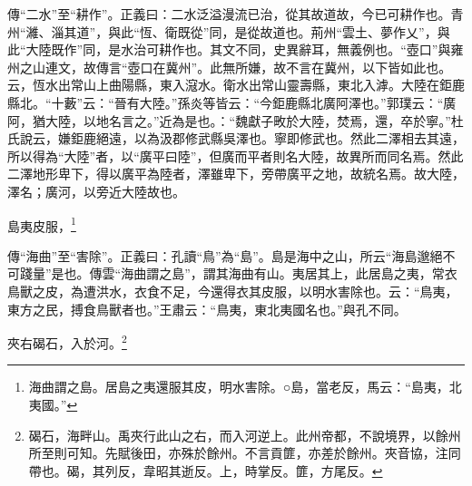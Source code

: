 {\noindent\zhuan{}\fzbyks 傳“二水”至“耕作”。正義曰：二水泛溢漫流已治，從其故道故，今已可耕作也。青州“濰、淄其道”，與此“恆、衛既從”同，是從故道也。荊州“雲土、夢作乂”，與此“大陸既作”同，是水治可耕作也。其文不同，史異辭耳，無義例也。“壺口”與雍州之山連文，故傳言“壺口在冀州”。此無所嫌，故不言在冀州，以下皆如此也。云，恆水出常山上曲陽縣，東入滱水。衛水出常山靈壽縣，東北入滹。大陸在鉅鹿縣北。“十藪”云：“晉有大陸。”孫炎等皆云：“今鉅鹿縣北廣阿澤也。”郭璞云：“廣阿，猶大陸，以地名言之。”近為是也。：“魏獻子畋於大陸，焚焉，還，卒於寧。”杜氏說云，嫌鉅鹿絕遠，以為汲郡修武縣吳澤也。寧即修武也。然此二澤相去其遠，所以得為“大陸”者，以“廣平曰陸”，但廣而平者則名大陸，故異所而同名焉。然此二澤地形卑下，得以廣平為陸者，澤雖卑下，旁帶廣平之地，故統名焉。故大陸，澤名；廣河，以旁近大陸故也。 \par}

島夷皮服，\footnote{海曲謂之島。居島之夷還服其皮，明水害除。○島，當老反，馬云：“島夷，北夷國。”}

{\noindent\zhuan{}\fzbyks 傳“海曲”至“害除”。正義曰：孔讀“鳥”為“島”。島是海中之山，所云“海島邈絕不可踐量”是也。傳雲“海曲謂之島”，謂其海曲有山。夷居其上，此居島之夷，常衣鳥獸之皮，為遭洪水，衣食不足，今還得衣其皮服，以明水害除也。云：“鳥夷，東方之民，搏食鳥獸者也。”王肅云：“鳥夷，東北夷國名也。”與孔不同。 \par}

夾右碣石，入於河。\footnote{碣石，海畔山。禹夾行此山之右，而入河逆上。此州帝都，不說境界，以餘州所至則可知。先賦後田，亦殊於餘州。不言貢篚，亦差於餘州。夾音協，注同帶也。碣，其列反，韋昭其逝反。上，時掌反。篚，方尾反。}

